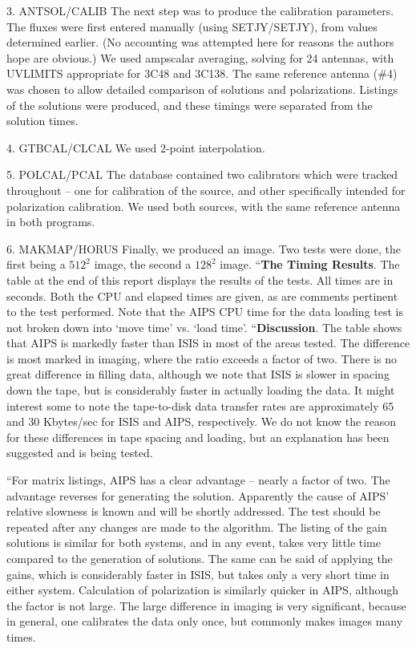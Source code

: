 {\item{3.} ANTSOL/CALIB The next step was to produce the calibration
parameters.  The fluxes were first entered manually (using SETJY/SETJY), from
values determined earlier. (No accounting was attempted here for reasons the
authors hope are obvious.)  We used ampscalar averaging, solving for 24
antennas, with UVLIMITS appropriate for
3C48 and 3C138.  The same reference antenna (\#4) was chosen to allow detailed
comparison of solutions and polarizations.  Listings of the solutions were
produced, and these timings were separated from the solution times.

\item{4.} GTBCAL/CLCAL  We used 2-point interpolation.

\item{5.} POLCAL/PCAL  The database contained two calibrators which were
tracked throughout -- one for calibration of the source, and other
specifically intended for polarization calibration.  We used both
sources, with the same reference antenna in both programs.

\item{6.} MAKMAP/HORUS Finally, we produced an image.  Two tests were done,
the first being a $512^2$ image, the second a $128^2$ image.
\medskip
``{\bf The Timing Results}.  The table at the end of this report displays the
results of the tests.  All times are in seconds.
Both the CPU and elapsed times are given, as are comments pertinent
to the test performed.  Note that the AIPS CPU time for the data loading test
is not broken down into `move time' vs. `load time'.
\medskip
``{\bf Discussion}.  The table shows that AIPS is markedly faster than ISIS in
most of the areas tested.  The difference is most marked in imaging, where the
ratio exceeds a factor of two.  There is no great difference in filling data,
although we note that ISIS is slower in spacing down the tape, but is
considerably faster
in actually loading the data.  It might interest some to note the tape-to-disk
data transfer rates are approximately 65 and 30 Kbytes/sec for ISIS and AIPS,
respectively.  We do not know the reason for these differences in tape spacing
and loading, but an explanation has been suggested and is being tested.

   ``For matrix listings, AIPS has a clear advantage -- nearly a factor of
two.  The advantage reverses for generating the solution.  Apparently the
cause of AIPS' relative slowness is known and will be shortly addressed.  The
test should be repeated after any changes are made to the algorithm.  The
listing of the gain solutions is similar for both systems, and in any event,
takes very little time compared to the generation of solutions.  The same can
be said of applying the gains, which is considerably faster in ISIS, but takes
only a very short time in either system.
Calculation of polarization is similarly quicker in AIPS, although the
factor is not large.
The large difference in imaging is very significant, because in
general, one calibrates the data only once, but commonly makes images many
times.

}
